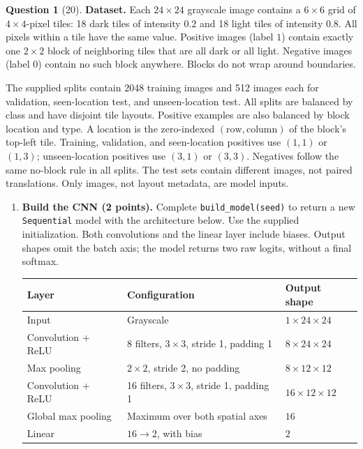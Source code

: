 \documentclass[12pt]{article}
\theoremstyle{definition}
\newtheorem{exercise}{Question}
\begin{document}
\begin{exercise}[20]
{\textbf{Dataset.}
Each $24\times24$ grayscale image contains a $6\times6$ grid of
$4\times4$-pixel tiles: 18 dark tiles of intensity $0.2$ and 18 light
tiles of intensity $0.8$. All pixels within a tile have the same value.
Positive images (label $1$) contain exactly one $2\times2$ block of
neighboring tiles that are all dark or all light. Negative images
(label $0$) contain no such block anywhere. Blocks do not wrap
around boundaries.

The supplied splits contain 2048 training images and 512 images each
for validation, seen-location test, and unseen-location test.
All splits are balanced by class and have disjoint tile layouts.
Positive examples are also balanced by block location and type.
A location is the zero-indexed $(\mathrm{row},\mathrm{column})$ of
the block's top-left tile. Training, validation, and seen-location
positives use $(1,1)$ or $(1,3)$; unseen-location positives use
$(3,1)$ or $(3,3)$. Negatives follow the same no-block rule in all
splits. The test sets contain different images, not paired translations.
Only images, not layout metadata, are model inputs.

\begin{enumerate}[label=\textbf{2.2.\arabic*}, leftmargin=*]

\item \textbf{Build the CNN (2 points).}
Complete \texttt{build\_model(seed)} to return a new
\texttt{Sequential} model with the architecture below.
Use the supplied initialization. Both convolutions and the
linear layer include biases. Output shapes omit the batch axis;
the model returns two raw logits, without a final softmax.

\begin{center}
\begin{tabular}{lll}
\toprule
Layer & Configuration & Output shape \\
\midrule
Input & Grayscale & $1\times24\times24$ \\
Convolution + ReLU & 8 filters, $3\times3$, stride 1, padding 1
    & $8\times24\times24$ \\
Max pooling & $2\times2$, stride 2, no padding
    & $8\times12\times12$ \\
Convolution + ReLU & 16 filters, $3\times3$, stride 1, padding 1
    & $16\times12\times12$ \\
Global max pooling & Maximum over both spatial axes & $16$ \\
Linear & $16\rightarrow2$, with bias & $2$ \\
\bottomrule
\end{tabular}
\end{center}


\end{enumerate}}
\end{exercise}
\end{document}
